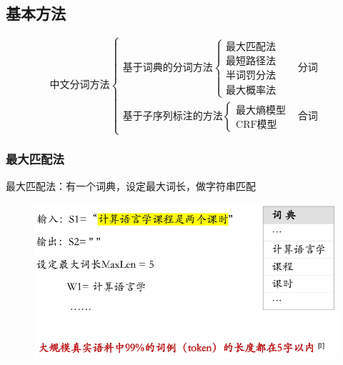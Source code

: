 \subsection{基本方法}
\[\text{中文分词方法}\begin{cases}
\text{基于词典的分词方法}\begin{cases}
\text{最大匹配法}\\
\text{最短路径法}\\
\text{半词罚分法}\\
\text{最大概率法}
\end{cases} & \text{分词}\\
\text{基于子序列标注的方法}\begin{cases}
\text{最大熵模型}\\
\text{CRF模型}
\end{cases} & \text{合词}
\end{cases}\]

\subsubsection{最大匹配法}
最大匹配法：有一个词典，设定最大词长，做字符串匹配
\begin{figure}[H]
\centering
\includegraphics[width=0.6\linewidth]{fig/max_matching.png}
\end{figure}

